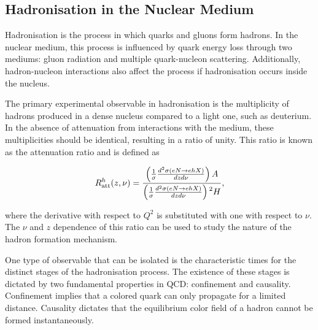 \subsection{Hadronisation in the Nuclear Medium}
\label{ssec::hadronisation_in_the_nuclear_medium}
    Hadronisation is the process in which quarks and gluons form hadrons.
    In the nuclear medium, this process is influenced by quark energy loss through two mediums: gluon radiation and multiple quark-nucleon scattering.
    Additionally, hadron-nucleon interactions also affect the process if hadronisation occurs inside the nucleus.

    The primary experimental observable in hadronisation is the multiplicity of hadrons produced in a dense nucleus compared to a light one, such as deuterium.
    In the absence of attenuation from interactions with the medium, these multiplicities should be identical, resulting in a ratio of unity.
    This ratio is known as the attenuation ratio and is defined as

    \begin{equation*}
        R^h_{\text{att}}(z,\nu) = \frac
            {\left( \frac{1}{\sigma} \frac{d^2\sigma(eN \rightarrow ehX)}{dzd\nu} \right)A}
            {\left( \frac{1}{\sigma} \frac{d^2\sigma(eN \rightarrow ehX)}{dzd\nu} \right){\prescript{2}{}{H}}},
    \end{equation*}

    where the derivative with respect to $Q^2$ is substituted with one with respect to $\nu$.
    The $\nu$ and $z$ dependence of this ratio can be used to study the nature of the hadron formation mechanism.

    One type of observable that can be isolated is the characteristic times for the distinct stages of the hadronisation process.
    The existence of these stages is dictated by two fundamental properties in QCD: confinement and causality.
    Confinement implies that a colored quark can only propagate for a limited distance.
    Causality dictates that the equilibrium color field of a hadron cannot be formed instantaneously.

    
    
    
